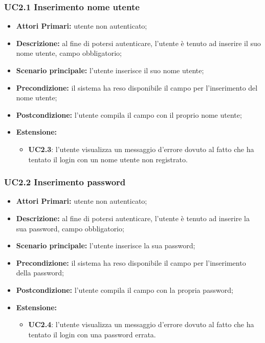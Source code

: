 \subsubsection{UC2.1 Inserimento nome utente}
\begin{itemize}
	\item \textbf{Attori Primari:} utente non autenticato;
	\item \textbf{Descrizione:} al fine di potersi autenticare, l'utente è tenuto ad inserire il suo nome utente, campo obbligatorio;
	\item \textbf{Scenario principale:} l'utente inserisce il suo nome utente;
	\item \textbf{Precondizione:} il sistema ha reso disponibile il campo per l'inserimento del nome utente;
	\item \textbf{Postcondizione:} l'utente compila il campo con il proprio nome utente;
	\item \textbf{Estensione:}
	\begin{itemize}
		\item \textbf{UC2.3}: l'utente visualizza un messaggio d'errore dovuto al fatto che ha tentato il login con un nome utente non registrato.
	\end{itemize}
\end{itemize}	

\subsubsection{UC2.2 Inserimento password}
\begin{itemize}
	\item \textbf{Attori Primari:} utente non autenticato;
	\item \textbf{Descrizione:} al fine di potersi autenticare, l'utente è tenuto ad inserire la sua password, campo obbligatorio;
	\item \textbf{Scenario principale:} l'utente inserisce la sua password;
	\item \textbf{Precondizione:} il sistema ha reso disponibile il campo per l'inserimento della password;
	\item \textbf{Postcondizione:} l'utente compila il campo con la propria password;
	\item \textbf{Estensione:}
	\begin{itemize}
		\item \textbf{UC2.4}: l'utente visualizza un messaggio d'errore dovuto al fatto che ha tentato il login con una password errata.
	\end{itemize}
\end{itemize}	

